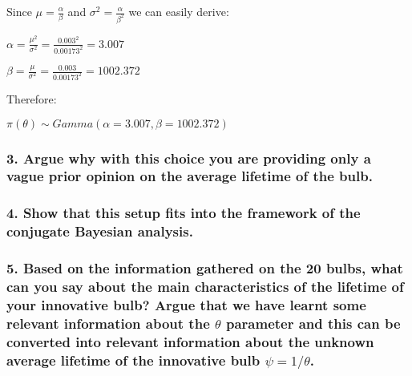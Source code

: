 \documentclass[
]{article}
\begin{document}
Since \(\mu = \frac{\alpha}{\beta}\) and
\(\sigma^2 = \frac{\alpha}{\beta^2}\) we can easily derive:

\(\alpha = \frac{\mu^2}{\sigma^2} = \frac{0.003^2}{0.00173^2} = 3.007\)

\(\beta = \frac{\mu}{\sigma^2} = \frac{0.003}{0.00173^2} = 1002.372\)

Therefore:

\(\pi(\theta) \sim Gamma(\alpha = 3.007, \beta = 1002.372)\)

\hypertarget{argue-why-with-this-choice-you-are-providing-only-a-vague-prior-opinion-on-the-average-lifetime-of-the-bulb.}{%
\subsubsection{3. Argue why with this choice you are providing only a
vague prior opinion on the average lifetime of the
bulb.}\label{argue-why-with-this-choice-you-are-providing-only-a-vague-prior-opinion-on-the-average-lifetime-of-the-bulb.}}

\hypertarget{show-that-this-setup-fits-into-the-framework-of-the-conjugate-bayesian-analysis.}{%
\subsubsection{4. Show that this setup fits into the framework of the
conjugate Bayesian
analysis.}\label{show-that-this-setup-fits-into-the-framework-of-the-conjugate-bayesian-analysis.}}

\hypertarget{based-on-the-information-gathered-on-the-20-bulbs-what-can-you-say-about-the-main-characteristics-of-the-lifetime-of-your-innovative-bulb-argue-that-we-have-learnt-some-relevant-information-about-the-theta-parameter-and-this-can-be-converted-into-relevant-information-about-the-unknown-average-lifetime-of-the-innovative-bulb-psi1theta.}{%
\subsubsection{\texorpdfstring{5. Based on the information gathered on
the 20 bulbs, what can you say about the main characteristics of the
lifetime of your innovative bulb? Argue that we have learnt some
relevant information about the \(\theta\) parameter and this can be
converted into relevant information about the unknown average lifetime
of the innovative bulb
\(\psi=1/\theta\).}{5. Based on the information gathered on the 20 bulbs, what can you say about the main characteristics of the lifetime of your innovative bulb? Argue that we have learnt some relevant information about the \textbackslash theta parameter and this can be converted into relevant information about the unknown average lifetime of the innovative bulb \textbackslash psi=1/\textbackslash theta.}}\label{based-on-the-information-gathered-on-the-20-bulbs-what-can-you-say-about-the-main-characteristics-of-the-lifetime-of-your-innovative-bulb-argue-that-we-have-learnt-some-relevant-information-about-the-theta-parameter-and-this-can-be-converted-into-relevant-information-about-the-unknown-average-lifetime-of-the-innovative-bulb-psi1theta.}}
\end{document}
